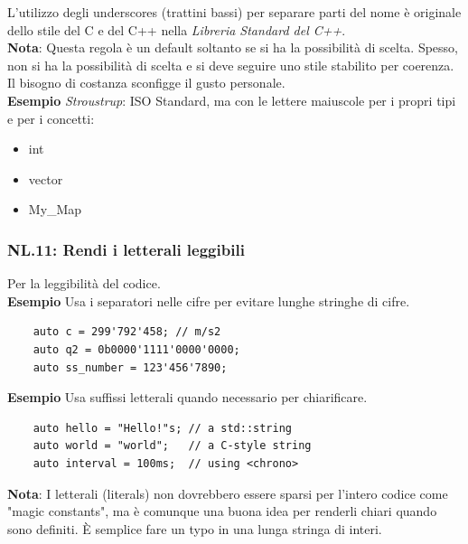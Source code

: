 \textsf{\small L'utilizzo degli underscores (trattini bassi) per separare parti del nome è originale dello stile del C e del C++ nella \emph{Libreria Standard del C++}.} \\

\textsf{\small \textbf{Nota}: Questa regola è un default soltanto se si ha la possibilità di scelta. Spesso, non si ha la possibilità di scelta e si deve seguire uno stile stabilito per coerenza. Il bisogno di costanza sconfigge il gusto personale.} \\

\textsf{\small \textbf{Esempio} \emph{Stroustrup}: ISO Standard, ma con le lettere maiuscole per i propri tipi e per i concetti: }

\begin{itemize}
	\item \textsf{\small int}
	\item \textsf{\small vector}
	\item \textsf{\small My\_Map}
\end{itemize}

\subsubsection{NL.11: Rendi i letterali leggibili}

\textsf{\small Per la leggibilità del codice.} \\

\textsf{\small \textbf{Esempio} Usa i separatori nelle cifre per evitare lunghe stringhe di cifre.}

\begin{lstlisting}
	auto c = 299'792'458; // m/s2
	auto q2 = 0b0000'1111'0000'0000;
	auto ss_number = 123'456'7890;
\end{lstlisting}

\textsf{\small \textbf{Esempio} Usa suffissi letterali quando necessario per chiarificare.}

\begin{lstlisting}
	auto hello = "Hello!"s; // a std::string
	auto world = "world";   // a C-style string
	auto interval = 100ms;  // using <chrono>
\end{lstlisting}

\textsf{\small \textbf{Nota}: I letterali (literals) non dovrebbero essere sparsi per l'intero codice come "magic constants", ma è comunque una buona idea per renderli chiari quando sono definiti. È semplice fare un typo in una lunga stringa di interi.} \\

